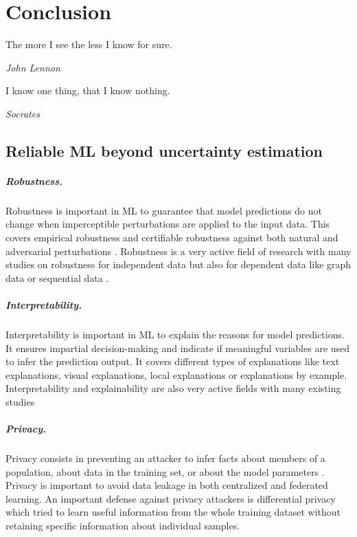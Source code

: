\chapter{Conclusion}
\label{chap:conclusion}

\epigraph{The more I see the less I know for sure.}{\textit{John Lennon}}

\epigraph{I know one thing, that I know nothing.}{\textit{Socrates}}

\section{Reliable ML beyond uncertainty estimation}

\paragraph{Robustness.} Robustness is important in ML to guarantee that model predictions do not change when imperceptible perturbations are applied to the input data. This covers empirical robustness and certifiable robustness against both natural and adversarial perturbations \cite{tu2020empirical, chun2020empirical, cohen2019, zugner2020certifiable}. Robustness is a very active field of research with many studies on robustness for independent data \cite{silva2020opportunies} but also for dependent data like graph data \cite{GNNBook-ch8-gunnemann} or sequential data \cite{cheng2020}.

\paragraph{Interpretability.} Interpretability is important in ML to explain the reasons for model predictions. It ensures impartial decision-making and indicate if meaningful variables are used to infer the prediction output. It covers different types of explanations like text explanations, visual explanations, local explanations or explanations by example. Interpretability and explainability are also very active fields with many existing studies \cite{arrieta2019explainable, overview-interpretable-ml}

\paragraph{Privacy.} Privacy consists in preventing an attacker to infer facts about members of a population, about data in the training set, or about the model parameters \cite{cristofaro2020privacy, cristofaro2021privacy}. Privacy is important to avoid data leakage in both centralized and federated learning. An important defense against privacy attackers is differential privacy \cite{buglesi2006privacy} which tried to learn useful information from the whole training dataset without retaining specific information about individual samples.


